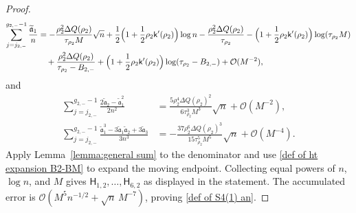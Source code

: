 \documentclass[a4paper]{article}
\numberwithin{equation}{section}
\begin{document}
\begin{proof}
\begin{align*}
\sum_{j=j_{2,-}}^{g_{2,-}-1}
\frac{\widetilde{\mathfrak{a}}_1}{n} 
&=-\frac{\rho_2^2\Delta Q(\rho_2)}{\tau_{\rho_2}M}\sqrt{n}
+\frac{1}{2}\Bigl(1+\frac{1}{2}\rho_2\mathsf{k}'(\rho_2)\Bigr)\log n
-\frac{\rho_2^2\Delta Q(\rho_2)}{\tau_{\rho_2}}
-\Bigl(1+\frac{1}{2}\rho_2\mathsf{k}'(\rho_2)\Bigr)\log(\tau_{\rho_2}M)
\\
&\quad
+\frac{\rho_2^2\Delta Q(\rho_2)}{\tau_{\rho_2}-B_{2,-}}+\Bigl(1+\frac{1}{2}\rho_2\mathsf{k}'(\rho_2)\Bigr)\log(\tau_{\rho_2}-B_{2,-})
+\mathcal{O}(M^{-2}),
\end{align*}
and 
\begin{align*}
\sum_{j=j_{2,-}}^{g_{2,-}-1}
\frac{2\widetilde{\mathfrak{a}}_2-\widetilde{\mathfrak{a}}_1^2}{2n^2}
&=\frac{5\rho_2^4\Delta Q(\rho_2)^2}{6\tau_{\rho_2}^3M^3}\sqrt{n}+\mathcal{O}(M^{-2}),
\\
\sum_{j=j_{2,-}}^{g_{2,-}-1}
\frac{\widetilde{\mathfrak{a}}_1^3-3\widetilde{\mathfrak{a}}_1\widetilde{\mathfrak{a}}_2+3\widetilde{\mathfrak{a}}_3}{3n^3}
&=-\frac{37\rho_2^6\Delta Q(\rho_2)^3}{15\tau_{\rho_2}^5M^5}\sqrt{n}+\mathcal{O}(M^{-4}).
\end{align*}
Apply Lemma~\ref{lemma:general sum} to the denominator and use \eqref{def of ht expansion B2-BM} to expand the moving endpoint. Collecting equal powers of $n$, $\log n$, and $M$ gives $\mathsf H_{1,2},\ldots,\mathsf H_{6,2}$ as displayed in the statement. The accumulated error is $\mathcal O(M^5n^{-1/2}+\sqrt n\,M^{-7})$, proving \eqref{def of S4(1) an}.
\end{proof}
\end{document}
